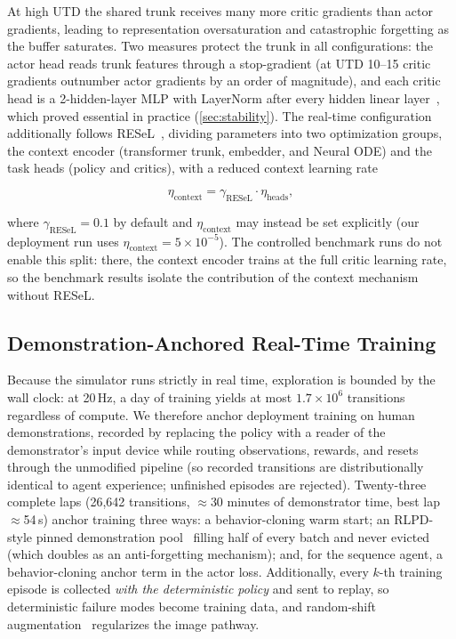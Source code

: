 \documentclass[conference]{IEEEtran}
\begin{document}
At high UTD the shared trunk receives many more critic gradients than actor gradients, leading to representation oversaturation and catastrophic forgetting as the buffer saturates. Two measures protect the trunk in all configurations: the actor head reads trunk features through a stop-gradient (at UTD 10--15 critic gradients outnumber actor gradients by an order of magnitude), and each critic head is a 2-hidden-layer MLP with LayerNorm after every hidden linear layer~\cite{droq}, which proved essential in practice (\cref{sec:stability}). The real-time configuration additionally follows RESeL~\cite{resel}, dividing parameters into two optimization groups, the context encoder (transformer trunk, embedder, and Neural ODE) and the task heads (policy and critics), with a reduced context learning rate

\begin{equation}

    \eta_{\text{context}} = \gamma_{\text{RESeL}} \cdot \eta_{\text{heads}},

\end{equation}

where $\gamma_{\text{RESeL}} = 0.1$ by default and $\eta_{\text{context}}$ may instead be set explicitly (our deployment run uses $\eta_{\text{context}} = 5 \times 10^{-5}$). The controlled benchmark runs do not enable this split: there, the context encoder trains at the full critic learning rate, so the benchmark results isolate the contribution of the context mechanism without RESeL.



\subsection{Demonstration-Anchored Real-Time Training}

\label{sec:demos}

Because the simulator runs strictly in real time, exploration is bounded by the wall clock: at 20\,Hz, a day of training yields at most $1.7 \times 10^6$ transitions regardless of compute. We therefore anchor deployment training on human demonstrations, recorded by replacing the policy with a reader of the demonstrator's input device while routing observations, rewards, and resets through the unmodified pipeline (so recorded transitions are distributionally identical to agent experience; unfinished episodes are rejected). Twenty-three complete laps (26{,}642 transitions, $\approx$30 minutes of demonstrator time, best lap $\approx$54\,s) anchor training three ways: a behavior-cloning warm start; an RLPD-style pinned demonstration pool~\cite{rlpd} filling half of every batch and never evicted (which doubles as an anti-forgetting mechanism); and, for the sequence agent, a behavior-cloning anchor term in the actor loss. Additionally, every $k$-th training episode is collected \emph{with the deterministic policy} and sent to replay, so deterministic failure modes become training data, and random-shift augmentation~\cite{drq} regularizes the image pathway.
\end{document}
